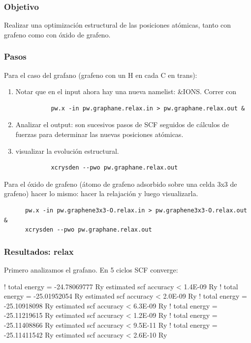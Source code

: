 \subsubsection{Objetivo}

  Realizar una optimización estructural de las posiciones atómicas, tanto con grafeno como con óxido de grafeno.

\subsubsection{Pasos}

  Para el caso del grafano (grafeno con un H en cada C en trans):

    \begin{enumerate}
      \item Notar que en el input ahora hay una nueva namelist: \&IONS. Correr con
        \begin{verbatim}
          pw.x -in pw.graphane.relax.in > pw.graphane.relax.out &
        \end{verbatim}
      \item Analizar el output: son sucesivos pasos de SCF seguidos de cálculos de fuerzas para determinar las nuevas posiciones atómicas.
      \item visualizar la evolución estructural.
        \begin{verbatim}
          xcrysden --pwo pw.graphane.relax.out
        \end{verbatim}
    \end{enumerate}

  Para el óxido de grafeno (átomo de grafeno adsorbido sobre una celda 3x3 de grafeno) hacer lo mismo: hacer la relajación y luego visualizarla.

    \begin{verbatim}
      pw.x -in pw.graphene3x3-O.relax.in > pw.graphene3x3-O.relax.out &
      xcrysden --pwo pw.graphane.relax.out
    \end{verbatim}

\subsubsection{Resultados: relax}

  Primero analizamos el grafano. En 5 ciclos SCF converge:

    !    total energy              =     -24.78069777 Ry
         estimated scf accuracy    <          1.4E-09 Ry
    !    total energy              =     -25.01952054 Ry
         estimated scf accuracy    <          2.0E-09 Ry
    !    total energy              =     -25.10918098 Ry
         estimated scf accuracy    <          6.3E-09 Ry
    !    total energy              =     -25.11219615 Ry
         estimated scf accuracy    <          1.2E-09 Ry
    !    total energy              =     -25.11408866 Ry
         estimated scf accuracy    <          9.5E-11 Ry
    !    total energy              =     -25.11411542 Ry
         estimated scf accuracy    <          2.6E-10 Ry

